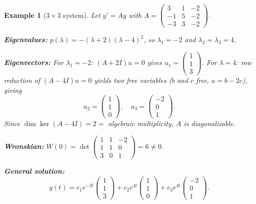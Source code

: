 \documentclass{article}
\newtheorem*{example}{Example}
\begin{document}
\begin{example}[$3\times 3$ system]
    Let $y' = Ay$ with 
    $A = \begin{pmatrix}3&1&-2\\-1&5&-2\\-3&3&-2\end{pmatrix}$.

    \textbf{Eigenvalues:} $p(\lambda) = -(\lambda+2)(\lambda-4)^2$, 
    so $\lambda_1 = -2$ and $\lambda_2 = \lambda_3 = 4$.

    \textbf{Eigenvectors:}
    For $\lambda_1 = -2$: $(A+2I)u = 0$ gives 
    $u_1 = \begin{pmatrix}1\\1\\3\end{pmatrix}$.
    For $\lambda = 4$: row reduction of $(A-4I)u = 0$ yields two 
    free variables ($b$ and $c$ free, $a = b-2c$), giving
    \[u_2 = \begin{pmatrix}1\\1\\0\end{pmatrix}, \quad 
    u_3 = \begin{pmatrix}-2\\0\\1\end{pmatrix}.\]
    Since $\dim\ker(A-4I) = 2 =$ algebraic multiplicity, $A$ is 
    diagonalizable.

    \textbf{Wronskian:} $W(0) = \det\begin{pmatrix}1&1&-2\\1&1&0\\
    3&0&1\end{pmatrix} = 6 \neq 0$.

    \textbf{General solution:}
    \[y(t) = c_1 e^{-2t}\begin{pmatrix}1\\1\\3\end{pmatrix} + 
    c_2 e^{4t}\begin{pmatrix}1\\1\\0\end{pmatrix} + 
    c_3 e^{4t}\begin{pmatrix}-2\\0\\1\end{pmatrix}.\]
\end{example}
\end{document}

